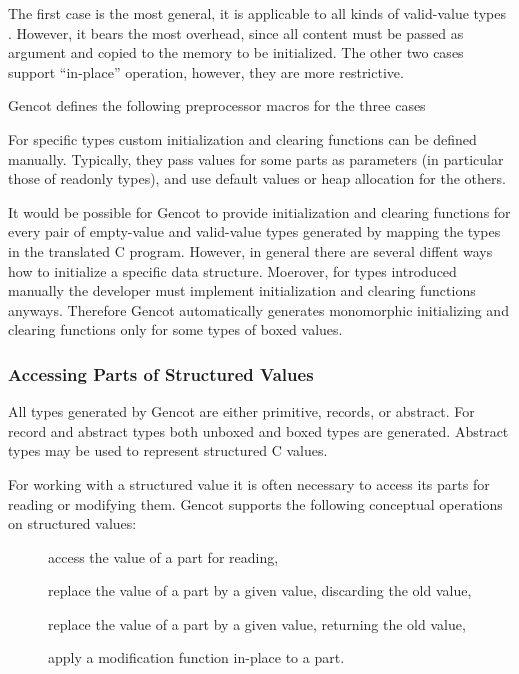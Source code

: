 The first case is the most general, it is applicable to all kinds of valid-value types . However, it bears the
most overhead, since all content must be passed as argument and copied to the memory to be initialized. The other
two cases support ``in-place'' operation, however, they are more restrictive.

Gencot defines the following preprocessor macros for the three cases 


For specific types  custom initialization and clearing functions can be defined manually. Typically, they 
pass values for some parts as parameters (in particular those of readonly types), and use default values or heap
allocation for the others.





It would be possible for Gencot to provide initialization and clearing functions for every pair of empty-value
and valid-value types generated by mapping the types in the translated C program. However, in general there are 
several diffent ways how to initialize a specific data structure. Moerover, for types introduced manually the developer 
must implement initialization and clearing functions anyways. Therefore Gencot automatically generates
monomorphic initializing and clearing functions only for some types of boxed values.


\subsubsection{Accessing Parts of Structured Values}

All types generated by Gencot are either primitive, records, or abstract. For record and abstract types both 
unboxed and boxed types are generated. Abstract types may be used to represent structured C values.

For working with a structured value it is often necessary to access its parts for reading or modifying them.
Gencot supports the following conceptual operations on structured values:
\begin{description}
  \item[] access the value of a part for reading,
  \item[] replace the value of a part by a given value, discarding the old value,
  \item[] replace the value of a part by a given value, returning the old value,
  \item[] apply a modification function in-place to a part.
\end{description}

